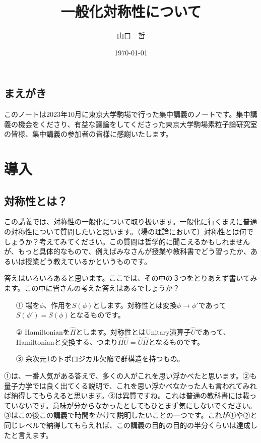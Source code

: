 \documentclass[report,paper=a4, fontsize=12pt, line_length=16cm, number_of_lines=33,dvipdfmx]{jlreq}
\title{一般化対称性について}
\author{山口　哲}
\date{\today}
\numberwithin{equation}{chapter}
\newcommand{\Hh}{\widehat{H}}
\newcommand{\Uh}{\widehat{U}}
\begin{document}
\maketitle
\tableofcontents

\section*{まえがき}

このノートは2023年10月に東京大学駒場で行った集中講義のノートです。集中講義の機会をくださり、有益な議論をしてくださった東京大学駒場素粒子論研究室の皆様、集中講義の参加者の皆様に感謝いたします。

\chapter{導入}
\section{対称性とは？}

この講義では、対称性の一般化について取り扱います。一般化に行くまえに普通の対称性について質問したいと思います。（場の理論において）対称性とは何でしょうか？考えてみてください。この質問は哲学的に聞こえるかもしれませんが、もっと具体的なもので、例えばみなさんが授業や教科書でどう習ったか、あるいは授業どう教えているかというものです。

答えはいろいろあると思います。ここでは、その中の３つをとりあえず書いてみます。この中に皆さんの考えた答えはあるでしょうか？
\begin{itemize}
  \item[①] 場を$\phi$、作用を$S(\phi)$とします。対称性とは変換$\phi\to\phi'$であって$S(\phi')=S(\phi)$となるものです。
  \item[②] Hamiltonianを$\Hh$とします。対称性とはUnitary演算子$\Uh$であって、Hamiltonianと交換する、つまり$\Hh \Uh =\Uh \Hh$となるものです。
  \item[③] 余次元1のトポロジカル欠陥で群構造を持つもの。  
\end{itemize}
①は、一番人気がある答えで、多くの人がこれを思い浮かべたと思います。②も量子力学では良く出てくる説明で、これを思い浮かべなかった人も言われてみれば納得してもらえると思います。③は異質ですね。これは普通の教科書には載っていないです。意味が分からなかったとしてもひとまず気にしないでください。③はこの後この講義で時間をかけて説明したいことの一つです。これが①や②と同じレベルで納得してもらえれば、この講義の目的の目的の半分くらいは達成したと言えます。
\end{document}
